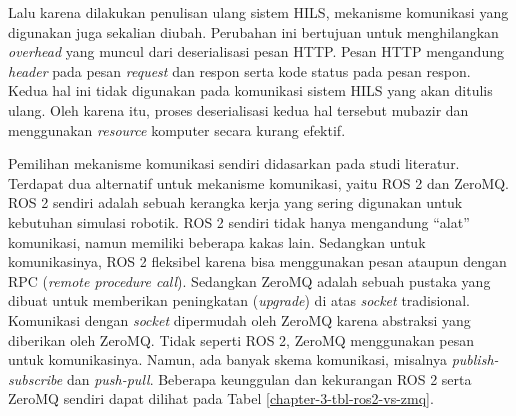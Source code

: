 Lalu karena dilakukan penulisan ulang sistem HILS, mekanisme komunikasi yang
digunakan juga sekalian diubah. Perubahan ini bertujuan untuk menghilangkan
\textit{overhead} yang muncul dari deserialisasi pesan HTTP. Pesan HTTP
mengandung \textit{header} pada pesan \textit{request} dan respon serta kode
status pada pesan respon. Kedua hal ini tidak digunakan pada komunikasi sistem
HILS yang akan ditulis ulang. Oleh karena itu, proses deserialisasi kedua hal
tersebut mubazir dan menggunakan \textit{resource} komputer secara kurang
efektif.

Pemilihan mekanisme komunikasi sendiri didasarkan pada studi literatur.
Terdapat dua alternatif untuk mekanisme komunikasi, yaitu ROS 2 dan ZeroMQ.
ROS 2 sendiri adalah sebuah kerangka kerja yang sering digunakan untuk kebutuhan
simulasi robotik. ROS 2 sendiri tidak hanya mengandung ``alat'' komunikasi,
namun memiliki beberapa kakas lain. Sedangkan untuk komunikasinya, ROS 2
fleksibel karena bisa menggunakan pesan ataupun dengan RPC (\textit{remote
	procedure call}). Sedangkan ZeroMQ adalah sebuah pustaka yang dibuat untuk
memberikan peningkatan (\textit{upgrade}) di atas \textit{socket}
tradisional. Komunikasi dengan \textit{socket} dipermudah oleh ZeroMQ karena
abstraksi yang diberikan oleh ZeroMQ. Tidak seperti ROS 2, ZeroMQ menggunakan
pesan untuk komunikasinya. Namun, ada banyak skema komunikasi, misalnya
\textit{publish-subscribe} dan \textit{push-pull}. Beberapa keunggulan dan
kekurangan ROS 2 serta ZeroMQ sendiri dapat dilihat pada Tabel
\ref{chapter-3-tbl-ros2-vs-zmq}.

